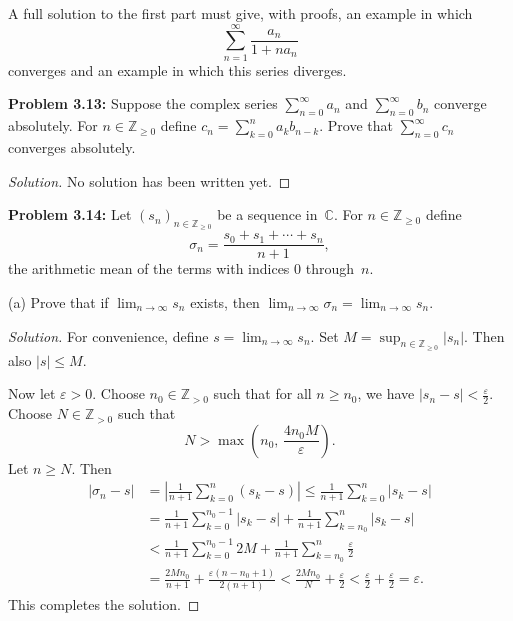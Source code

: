 \documentclass[10pt]{amsart}
\newcommand{\I}{\infty}
\newcommand{\limi}[1]{\lim_{{#1} \to \infty}}
\theoremstyle{definition}
\newcommand{\ep}{\varepsilon}
\newcommand{\sm}{\sigma}
\newcommand{\C}{{\mathbb{C}}}
\newcommand{\N}{{\mathbb{Z}}_{> 0}}
\newcommand{\Nz}{{\mathbb{Z}}_{\geq 0}}
\begin{document}
A full solution to the first part must give,
with proofs,
an example in which
\[
\sum_{n = 1}^{\infty} \frac{a_n}{1 + n a_n}
\]
converges
and an example in which this series diverges.




\vspace{2ex}

\noindent
{\textbf{Problem 3.13:}}
Suppose the complex series $\sum_{n = 0}^{\I} a_n$
and $\sum_{n = 0}^{\I} b_n$ converge absolutely.
For $n \in \Nz$ define
$c_n = \sum_{k = 0}^n a_k b_{n - k}$.
Prove that $\sum_{n = 0}^{\I} c_n$ converges absolutely.

\begin{proof}[Solution]
No solution has been written yet.
\end{proof}

\vspace{2ex}


\vspace{2ex}

\noindent
{\textbf{Problem 3.14:}}
Let $(s_n)_{n \in \Nz}$ be a sequence in~$\C$.
For $n \in \Nz$
define
\[
\sm_n = \frac{s_0 + s_1 + \cdots + s_n}{n + 1},
\]
the arithmetic mean of the terms with indices $0$ through~$n$.

\vspace{1ex}

(a)
Prove that if $\limi{n} s_n$ exists,
then $\limi{n} \sm_n = \limi{n} s_n$.

\begin{proof}[Solution]
For convenience,
define $s = \limi{n} s_n$.
Set $M = \sup_{n \in \Nz} | s_n |$.
Then also $| s | \leq M$.

Now let $\ep > 0$.
Choose $n_0 \in \N$ such that for all $n \geq n_0$,
we have $| s_n - s | < \frac{\ep}{2}$.
Choose $N \in \N$ such that
\[
N > \max \left( n_0, \, \frac{4 n_0 M}{\ep} \right).
\]
Let $n \geq N$.
Then
%
\begin{align*}
| \sm_n - s |
& = \left| \frac{1}{n + 1} \sum_{k = 0}^n (s_k - s) \right|
  \leq \frac{1}{n + 1} \sum_{k = 0}^n | s_k - s |
\\
& = \frac{1}{n + 1} \sum_{k = 0}^{n_0 - 1} | s_k - s |
     + \frac{1}{n + 1} \sum_{k = n_0}^n | s_k - s |
\\
& < \frac{1}{n + 1} \sum_{k = 0}^{n_0 - 1} 2 M
     + \frac{1}{n + 1} \sum_{k = n_0}^n \frac{\ep}{2}
\\
& = \frac{2 M n_0}{n + 1} + \frac{\ep (n - n_0 + 1)}{2 (n + 1)}
  < \frac{2 M n_0}{N} + \frac{\ep}{2}
  < \frac{\ep}{2} + \frac{\ep}{2}
  = \ep.
\end{align*}
%
This completes the solution.
\end{proof}
\end{document}
